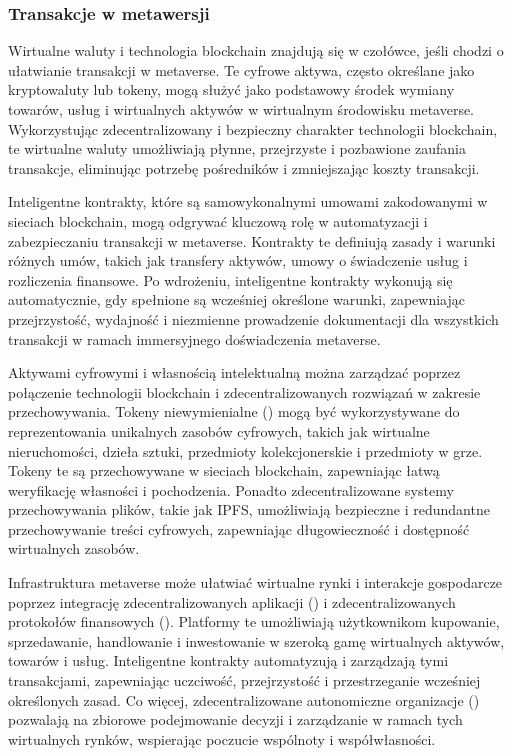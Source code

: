 \subsubsection{Transakcje w metawersji}

Wirtualne waluty i technologia blockchain znajdują się w czołówce, jeśli chodzi o ułatwianie transakcji w metaverse. Te cyfrowe aktywa, często określane jako kryptowaluty lub tokeny, mogą służyć jako podstawowy środek wymiany towarów, usług i wirtualnych aktywów w wirtualnym środowisku metaverse. Wykorzystując zdecentralizowany i bezpieczny charakter technologii blockchain, te wirtualne waluty umożliwiają płynne, przejrzyste i pozbawione zaufania transakcje, eliminując potrzebę pośredników i zmniejszając koszty transakcji\cite{metaverseInfrastructureIEEE}.

Inteligentne kontrakty, które są samowykonalnymi umowami zakodowanymi w sieciach blockchain, mogą odgrywać kluczową rolę w automatyzacji i zabezpieczaniu transakcji w metaverse. Kontrakty te definiują zasady i warunki różnych umów, takich jak transfery aktywów, umowy o świadczenie usług i rozliczenia finansowe. Po wdrożeniu, inteligentne kontrakty wykonują się automatycznie, gdy spełnione są wcześniej określone warunki, zapewniając przejrzystość, wydajność i niezmienne prowadzenie dokumentacji dla wszystkich transakcji w ramach immersyjnego doświadczenia metaverse\cite{metaverseInfrastructureIEEE}.

Aktywami cyfrowymi i własnością intelektualną można zarządzać poprzez połączenie technologii blockchain i zdecentralizowanych rozwiązań w zakresie przechowywania. Tokeny niewymienialne  () mogą być wykorzystywane do reprezentowania unikalnych zasobów cyfrowych, takich jak wirtualne nieruchomości, dzieła sztuki, przedmioty kolekcjonerskie i przedmioty w grze. Tokeny te są przechowywane w sieciach blockchain, zapewniając łatwą weryfikację własności i pochodzenia. Ponadto zdecentralizowane systemy przechowywania plików, takie jak IPFS, umożliwiają bezpieczne i redundantne przechowywanie treści cyfrowych, zapewniając długowieczność i dostępność wirtualnych zasobów\cite{metaverseInfrastructureIEEE}.

Infrastruktura metaverse może ułatwiać wirtualne rynki i interakcje gospodarcze poprzez integrację zdecentralizowanych aplikacji  () i zdecentralizowanych protokołów finansowych  (). Platformy te umożliwiają użytkownikom kupowanie, sprzedawanie, handlowanie i inwestowanie w szeroką gamę wirtualnych aktywów, towarów i usług. Inteligentne kontrakty automatyzują i zarządzają tymi transakcjami, zapewniając uczciwość, przejrzystość i przestrzeganie wcześniej określonych zasad. Co więcej, zdecentralizowane autonomiczne organizacje  () pozwalają na zbiorowe podejmowanie decyzji i zarządzanie w ramach tych wirtualnych rynków, wspierając poczucie wspólnoty i współwłasności\cite{metaverseInfrastructureIEEE}.


